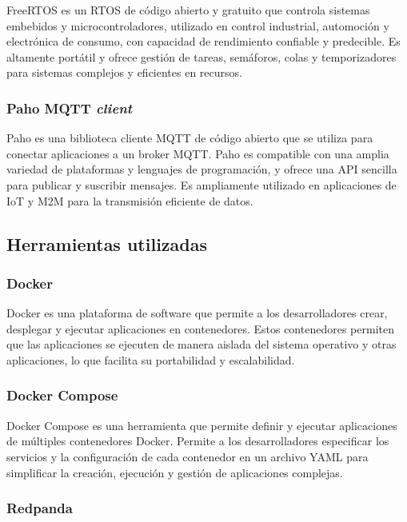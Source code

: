 FreeRTOS \citep{free-rtos} es un RTOS de código abierto y gratuito que controla sistemas embebidos y microcontroladores, utilizado en control industrial, automoción y electrónica de consumo, con capacidad de rendimiento confiable y predecible. Es altamente portátil y ofrece gestión de tareas, semáforos, colas y temporizadores para sistemas complejos y eficientes en recursos.


\subsubsection{Paho MQTT \textit{client}}

Paho \citep{paho-mqtt} es una biblioteca cliente MQTT de código abierto que se utiliza para conectar aplicaciones a un broker MQTT. Paho es compatible con una amplia variedad de plataformas y lenguajes de programación, y ofrece una API sencilla para publicar y suscribir mensajes. Es ampliamente utilizado en aplicaciones de IoT y M2M para la transmisión eficiente de datos.


\subsection{Herramientas utilizadas}


\subsubsection{Docker}

Docker \citep{docker} es una plataforma de software que permite a los desarrolladores crear, desplegar y ejecutar aplicaciones en contenedores. Estos contenedores permiten que las aplicaciones se ejecuten de manera aislada del sistema operativo y otras aplicaciones, lo que facilita su portabilidad y escalabilidad. 


\subsubsection{Docker Compose}

Docker Compose \citep{docker-compose} es una herramienta que permite definir y ejecutar aplicaciones de múltiples contenedores Docker. Permite a los desarrolladores especificar los servicios y la configuración de cada contenedor en un archivo YAML para simplificar la creación, ejecución y gestión de aplicaciones complejas. 


\subsubsection{Redpanda}


